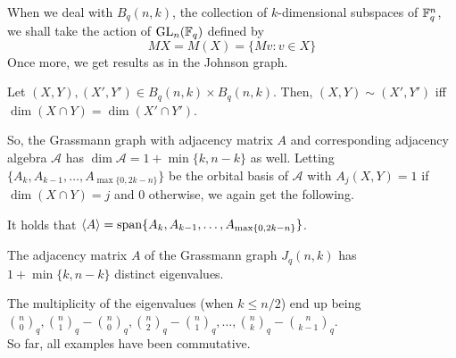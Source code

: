 	When we deal with $B_q(n,k)$, the collection of $k$-dimensional subspaces of $\mathbb{F}_q^n$, we shall take the action of $\operatorname{GL}_n(\mathbb{F}_q)$ defined by
	\[ MX = M(X) = \{Mv : v \in X\} \]
	Once more, we get results as in the Johnson graph.

	\begin{flem}
		Let $(X,Y), (X',Y') \in B_q(n,k) \times B_q(n,k)$. Then, $(X,Y) \sim (X',Y')$ iff $\dim(X \cap Y) = \dim(X' \cap Y')$.
	\end{flem}
	So, the Grassmann graph with adjacency matrix $A$ and corresponding adjacency algebra $\mathcal{A}$ has $\dim \mathcal{A} = 1+\min\{k,n-k\}$ as well. Letting $\{A_k,A_{k-1},\ldots,A_{\max\{0,2k-n\}}\}$ be the orbital basis of $\mathcal{A}$ with $A_j(X,Y) = 1$ if $\dim(X \cap Y) = j$ and $0$ otherwise, we again get the following.

	\begin{fprop}
		\label{prop: johnson-adj-eigenvals}
		It holds that $\langle A\rangle = \operatorname{span}\{A_k,A_{k-1},\ldots,A_{\max\{0,2k-n\}}\}$.
	\end{fprop}

	\begin{fcor}
	 	The adjacency matrix $A$ of the Grassmann graph $J_q(n,k)$ has $1+\min\{k,n-k\}$ distinct eigenvalues. 
	 \end{fcor}
	 
	 The multiplicity of the eigenvalues (when $k \le n/2$) end up being $\binom{n}{0}_q, \binom{n}{1}_q-\binom{n}{0}_q, \binom{n}{2}_q-\binom{n}{1}_q, \ldots, \binom{n}{k}_q-\binom{n}{k-1}_q$.\\

	 So far, all examples have been commutative.

